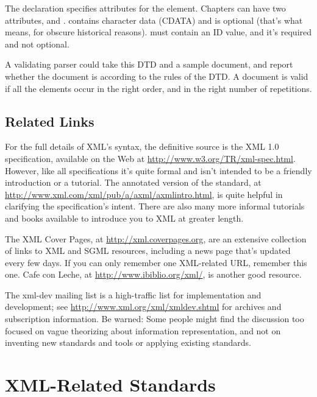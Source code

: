 \documentclass{howto}
\newcommand{\element}[1]{\code{#1}}
\newcommand{\attribute}[1]{\code{#1}}
\begin{document}
The  declaration specifies attributes for the
\element{chapter} element.  Chapters can have two attributes,
\attribute{id} and \attribute{title}.  \attribute{title} contains
character data (CDATA) and is optional (that's what 
means, for obscure historical reasons).  \attribute{id} must contain
an ID value, and it's required and not optional.  

A validating parser could take this DTD and a sample document, and
report whether the document is  according to the rules of
the DTD.  A document is valid if all the elements occur in the right
order, and in the right number of repetitions.


\subsection{Related Links\label{section-xml-links}}

For the full details of XML's syntax, the definitive source is the XML
1.0 specification, available on the Web at
\url{http://www.w3.org/TR/xml-spec.html}.  However, like all
specifications it's quite formal and isn't intended to be a friendly
introduction or a tutorial.  The annotated version of the standard, at
\url{http://www.xml.com/xml/pub/a/axml/axmlintro.html}, is quite helpful
in clarifying the specification's intent.  There are also many more
informal tutorials and books available to introduce you to XML at
greater length.

The XML Cover Pages, at \url{http://xml.coverpages.org}, are an
extensive collection of links to XML and SGML resources, including a
news page that's updated every few days.  If you can only remember one
XML-related URL, remember this one.  Cafe con Leche, 
at \url{http://www.ibiblio.org/xml/}, is another good resource.

The xml-dev mailing list is a high-traffic list for implementation and
development; see \url{http://www.xml.org/xml/xmldev.shtml} for
archives and subscription information.  Be warned: Some people might
find the discussion too focused on vague theorizing about information
representation, and not on inventing new standards and tools or
applying existing standards.


\section{XML-Related Standards\label{section-standards}}
\end{document}
